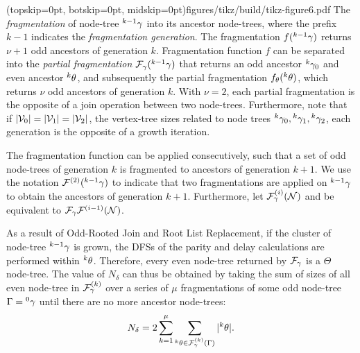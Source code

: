 \Figure[hbt](topskip=0pt, botskip=0pt, midskip=0pt){figures/tikz/build/tikz-figure6.pdf}{
  The \emph{fragmentation} of node-tree ${}^{k-1}\gamma$ into its ancestor node-trees, where the prefix $k-1$ indicates the \emph{fragmentation generation}. The fragmentation $f({}^{k-1}\gamma)$ returns $\nu+1$ odd ancestors of generation $k$. Fragmentation function $f$ can be separated into the \emph{partial fragmentation} $\mathcal{F}_\gamma({}^{k-1}\gamma)$ that returns an odd ancestor ${}^{k}\gamma_0$ and even ancestor ${}^{k}\theta$, and subsequently the partial fragmentation $f_\theta({}^{k}\theta)$, which returns $\nu$ odd ancestors of generation $k$. With $\nu=2$, each partial fragmentation is the opposite of a join operation between two node-trees. Furthermore, note that if $\lvert\mathcal{V}_0\rvert = \lvert\mathcal{V}_1\rvert = \lvert\mathcal{V}_2\rvert$, the vertex-tree sizes related to node trees ${}^{k}\gamma_0, {}^{k}\gamma_1, {}^{k}\gamma_2$, each generation is the opposite of a growth iteration. \label{fig6}}


The fragmentation function can be applied consecutively, such that a set of odd node-trees of generation $k$ is fragmented to ancestors of generation $k+1$. We use the notation $\mathcal{F}^{(2)}({}^{k-1}\gamma)$ to indicate that two fragmentations are applied on ${}^{k-1}\gamma$ to obtain the ancestors of generation $k+1$. Furthermore, let $\mathcal{F}_\gamma^{(i)}(\mathcal{N})$ and be equivalent to $\mathcal{F}_\gamma \mathcal{F}^{(i-1)}(\mathcal{N})$. 

As a result of Odd-Rooted Join and Root List Replacement, if the cluster of node-tree ${}^{k-1}\gamma$ is grown, the DFSs of the parity and delay calculations are performed within ${}^{k}\theta$. Therefore, every even node-tree returned by $\mathcal{F}_\gamma$ is a $\Theta$ node-tree. The value of $N_\delta$ can thus be obtained by taking the sum of sizes of all even node-tree in $\mathcal{F}_\gamma^{(k)}$ over a series of $\mu$ fragmentations of some odd node-tree $\Gamma = {}^{0}\gamma$ until there are no more ancestor node-trees:
\begin{equation}\label{eq:npdc}
  N_\delta = 2\sum_{k=1}^\mu{ \sum_{  {}^{k} \theta \in \mathcal{F}_\gamma^{(k)}(\Gamma) }{ \lvert {}^{k} \theta\rvert} }.
\end{equation}

